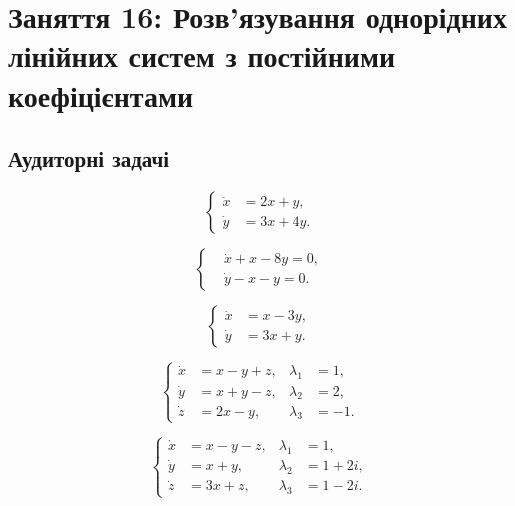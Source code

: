 \section*{Заняття 16: Розв'язування однорідних лінійних систем з постійними коефіцієнтами}

\subsection*{Аудиторні задачі}

\begin{problem}
	\[ \left\{ \begin{aligned} \dot x &= 2 x + y, \\ \dot y &= 3 x + 4 y. \end{aligned} \right. \]
\end{problem}

\begin{problem}
	\[ \left\{ \begin{aligned} & \dot x + x - 8 y = 0, \\ & \dot y - x - y = 0. \end{aligned} \right. \]
\end{problem}

\begin{problem}
	\[ \left\{ \begin{aligned} \dot x &= x - 3 y, \\ \dot y &= 3 x + y. \end{aligned} \right. \]
\end{problem}

\begin{problem}
	\[ \left\{ \begin{aligned} \dot x &= x - y + z, & \lambda_1 &= 1, \\ \dot y &= x + y - z, & \lambda_2 &= 2, \\ \dot z &= 2 x - y, & \lambda_3 &= - 1. \end{aligned} \right. \]
\end{problem}

\begin{problem}
	\[ \left\{ \begin{aligned} \dot x &= x - y - z, & \lambda_1 &= 1, \\ \dot y &= x + y, & \lambda_2 &= 1 + 2 i, \\ \dot z &= 3 x + z, & \lambda_3 &= 1 - 2 i. \end{aligned} \right. \]
\end{problem}


